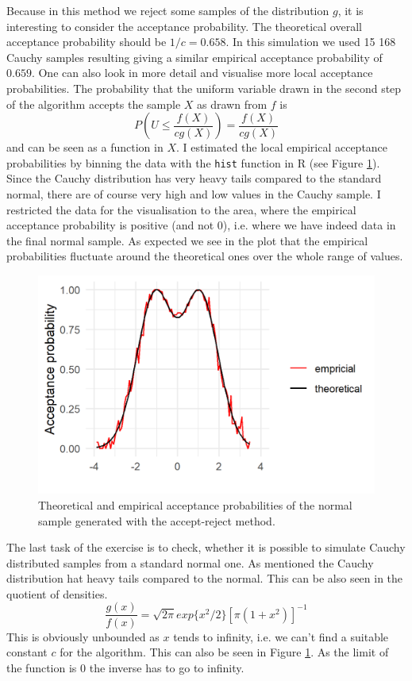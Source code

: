 Because in this method we reject some samples of the distribution $g$, it is interesting to consider the acceptance probability. The theoretical overall acceptance probability should be $1/c =0.658$. In this simulation we used 15 168 Cauchy samples resulting giving a similar empirical acceptance probability of $0.659$. One can also look in more detail and visualise more local acceptance probabilities. The probability that the uniform variable drawn in the second step of the algorithm accepts the sample $X$ as drawn from $f$ is $$P(U\leq \frac{f(X)}{cg(X)})=\frac{f(X)}{cg(X)}$$ and can be seen as a function in $X$. I estimated the local empirical acceptance probabilities by binning the data with the \texttt{hist} function in R (see Figure \ref{2normacc}). Since the Cauchy distribution has very heavy tails compared to the standard normal, there are of course very high and low values in the Cauchy sample. I restricted the data for the visualisation to the area, where the empirical acceptance probability is positive (and not 0), i.e. where we have indeed data in the final normal sample. As expected we see in the plot that the empirical probabilities fluctuate around the theoretical ones over the whole range of values.
\begin{figure}[hbt]
\includegraphics[width=0.7\linewidth, keepaspectratio]{ex2/acc_probs.png}
\centering
\caption{Theoretical and empirical acceptance probabilities of the normal sample generated with the accept-reject method.}
\label{2normacc}
\end{figure}

The last task of the exercise is to check, whether it is possible to simulate Cauchy distributed samples from a standard normal one. As mentioned the Cauchy distribution hat heavy tails compared to the normal. This can be also seen in the quotient of densities. $$\frac{g(x)}{f(x)}=\sqrt{2\pi}exp\{x^2/2\}[\pi (1+x^2)]^{-1}$$ This is obviously unbounded as $x$ tends to infinity, i.e. we can't find a suitable constant $c$ for the algorithm. This can also be seen in Figure \ref{2normacc}. As the limit of the function is 0 the inverse has to go to infinity.    